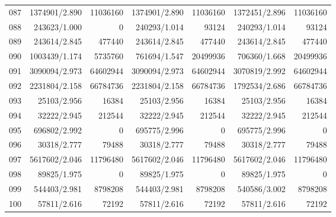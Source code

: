 \begin{longtable}{crrrrrr}
087 & 1374901/2.890 & 11036160 & 1374901/2.890 & 11036160 & 1372451/2.896 & 11036160 \\
088 & 243623/1.000 & 0 & 240293/1.014 & 93124 & 240293/1.014 & 93124 \\
089 & 243614/2.845 & 477440 & 243614/2.845 & 477440 & 243614/2.845 & 477440 \\
090 & 1003439/1.174 & 5735760 & 761694/1.547 & 20499936 & 706360/1.668 & 20499936 \\
091 & 3090094/2.973 & 64602944 & 3090094/2.973 & 64602944 & 3070819/2.992 & 64602944 \\
092 & 2231804/2.158 & 66784736 & 2231804/2.158 & 66784736 & 1792534/2.686 & 66784736 \\
093 & 25103/2.956 & 16384 & 25103/2.956 & 16384 & 25103/2.956 & 16384 \\
094 & 32222/2.945 & 212544 & 32222/2.945 & 212544 & 32222/2.945 & 212544 \\
095 & 696802/2.992 & 0 & 695775/2.996 & 0 & 695775/2.996 & 0 \\
096 & 30318/2.777 & 79488 & 30318/2.777 & 79488 & 30318/2.777 & 79488 \\
097 & 5617602/2.046 & 11796480 & 5617602/2.046 & 11796480 & 5617602/2.046 & 11796480 \\
098 & 89825/1.975 & 0 & 89825/1.975 & 0 & 89825/1.975 & 0 \\
099 & 544403/2.981 & 8798208 & 544403/2.981 & 8798208 & 540586/3.002 & 8798208 \\
100 & 57811/2.616 & 72192 & 57811/2.616 & 72192 & 57811/2.616 & 72192 \\
\end{longtable}

